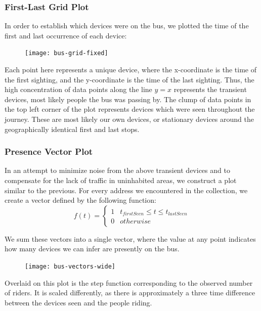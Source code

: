 \documentclass[11pt,journal,compsoc]{IEEEtran} %
\begin{document}
	\subsubsection*{First-Last Grid Plot}
		In order to establish which devices were on the bus, we plotted the time of the first and last occurrence of each device:

		\begin{figure}[!t]
		\texttt{[image: bus-grid-fixed]}
		\end{figure}

		Each point here represents a unique device, where the x-coordinate is the time of the first sighting, and the y-coordinate is the time of the last sighting.
		Thus, the high concentration of data points along the line \(y=x\) represents the transient devices, most likely people the bus was passing by.
		The clump of data points in the top left corner of the plot represents devices which were seen throughout the journey.
		These are most likely our own devices, or stationary devices around the geographically identical first and last stops.

	\subsubsection*{Presence Vector Plot}
		In an attempt to minimize noise from the above transient devices and to compensate for the lack of traffic in uninhabited areas, we construct a plot similar to the previous. %
		For every address we encountered in the collection, we create a vector defined by the following function:
		\begin{equation*}
		f(t) = \begin{cases}
			1 & t_{firstSeen} \le t \le t_{lastSeen}\\
			0 & otherwise
		\end{cases}
		\end{equation*}

		We sum these vectors into a single vector, where the value at any point indicates how many devices we can infer are presently on the bus.

		\begin{figure}[!t]
		\texttt{[image: bus-vectors-wide]}
		\end{figure}

		Overlaid on this plot is the step function corresponding to the observed number of riders.
		It is scaled differently, as there is approximately a three time difference between the devices seen and the people riding.
		
\end{document}
